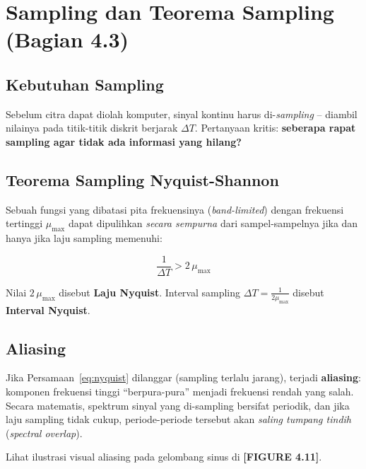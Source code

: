 \documentclass[12pt,a4paper]{article}
\begin{document}
\section{Sampling dan Teorema Sampling (Bagian 4.3)}

\subsection{Kebutuhan Sampling}

Sebelum citra dapat diolah komputer, sinyal kontinu harus di-\textit{sampling} --
diambil nilainya pada titik-titik diskrit berjarak $\Delta T$. Pertanyaan kritis:
\textbf{seberapa rapat sampling agar tidak ada informasi yang hilang?}

\subsection{Teorema Sampling Nyquist-Shannon}

Sebuah fungsi yang dibatasi pita frekuensinya (\textit{band-limited}) dengan
frekuensi tertinggi $\mu_{\max}$ dapat dipulihkan \textit{secara sempurna} dari
sampel-sampelnya jika dan hanya jika laju sampling memenuhi:

\begin{equation}
  \frac{1}{\Delta T} > 2\,\mu_{\max}
  \label{eq:nyquist}
\end{equation}

Nilai $2\,\mu_{\max}$ disebut \textbf{Laju Nyquist}. Interval sampling
$\Delta T = \tfrac{1}{2\mu_{\max}}$ disebut \textbf{Interval Nyquist}.

\subsection{Aliasing}

Jika Persamaan~\eqref{eq:nyquist} dilanggar (sampling terlalu jarang), terjadi
\textbf{aliasing}: komponen frekuensi tinggi ``berpura-pura'' menjadi frekuensi
rendah yang salah. Secara matematis, spektrum sinyal yang di-sampling bersifat
periodik, dan jika laju sampling tidak cukup, periode-periode tersebut akan
\textit{saling tumpang tindih} (\textit{spectral overlap}).

\begin{notebox}
Lihat ilustrasi visual aliasing pada gelombang sinus di \textbf{[FIGURE 4.11]}.
\end{notebox}
\end{document}
